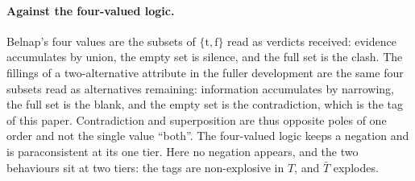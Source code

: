 
\paragraph{Against the four-valued logic.}\label{par:four-valued} Belnap's four values \cite{belnap1977useful} are the subsets of $\{\mathrm{t}, \mathrm{f}\}$ read as verdicts received: evidence accumulates by union, the empty set is silence, and the full set is the clash. The fillings of a two-alternative attribute in the fuller development \cite{Aethus} are the same four subsets read as alternatives remaining: information accumulates by narrowing, the full set is the blank, and the empty set is the contradiction, which is the tag of this paper. Contradiction and superposition are thus opposite poles of one order and not the single value ``both''. The four-valued logic keeps a negation and is paraconsistent at its one tier. Here no negation appears, and the two behaviours sit at two tiers: the tags are non-explosive in $T$, and $\bar{T}$ explodes.


